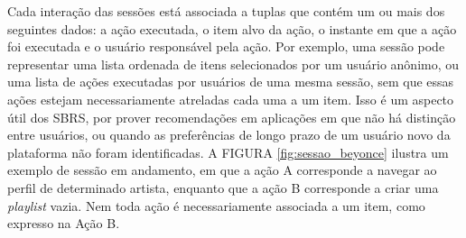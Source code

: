 Cada interação das sessões está associada a tuplas que contém um ou mais dos
seguintes dados: a ação executada, o item alvo da ação, o instante em que a ação
foi executada e o usuário responsável pela ação. Por exemplo, uma sessão pode
representar uma lista ordenada de itens selecionados por um usuário anônimo, ou
uma lista de ações executadas por usuários de uma mesma sessão, sem que essas
ações estejam necessariamente atreladas cada uma a um item. Isso é um aspecto
útil dos SBRS, por prover recomendações em aplicações em que não há distinção
entre usuários, ou quando as preferências de longo prazo de um usuário novo da
plataforma não foram identificadas. A FIGURA \ref{fig:sessao_beyonce} ilustra um
exemplo de sessão em andamento, em que a ação A corresponde a navegar ao perfil
de determinado artista, enquanto que a ação B corresponde a criar uma
\textit{playlist} vazia. Nem toda ação é necessariamente associada a um item,
como expresso na Ação B.
\vspace{0.4cm}